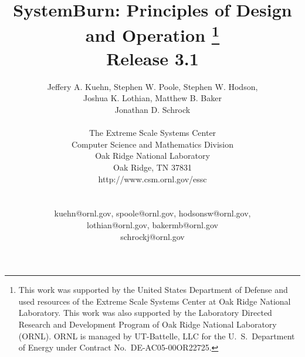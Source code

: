 \title{
	SystemBurn: Principles of Design and Operation
	\footnote{
		This work was supported by the United States Department of Defense and used resources of the
		Extreme Scale Systems Center at Oak Ridge National Laboratory.
		This work was also supported by the Laboratory Directed Research and
		Development Program of Oak Ridge National Laboratory (ORNL). ORNL is managed by UT-Battelle,
		LLC for the U.~S.~Department of Energy under Contract No.~DE-AC05-00OR22725.
	} \\
	Release 3.1\\
}

\author{
Jeffery A. Kuehn, Stephen W. Poole, Stephen W. Hodson,\\
Joshua K. Lothian, Matthew B. Baker \\
Jonathan D. Schrock \\
\\
The Extreme Scale Systems Center \\
Computer Science and Mathematics Division \\
Oak Ridge National Laboratory \\
Oak Ridge, TN 37831 \\
http://www.csm.ornl.gov/essc\\
\\
\\
kuehn@ornl.gov, spoole@ornl.gov, hodsonsw@ornl.gov,\\
lothian@ornl.gov, bakermb@ornl.gov \\
schrockj@ornl.gov\\
}
\maketitle
